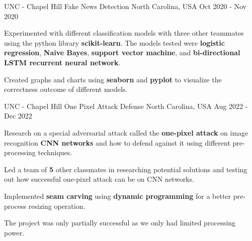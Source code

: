 

\begin{cventries}

  \cventry
    {UNC - Chapel Hill} %
    {Fake News Detection} %
    {North Carolina, USA} %
    {Oct 2020 - Nov 2020} %
    {
      \begin{cvitems} %
        \item {Experimented with different classification models with three other teammates using the python library \textbf{scikit-learn}. The models tested were \textbf{logistic regression}, \textbf{Naive Bayes}, \textbf{support vector machine}, and \textbf{bi-directional LSTM recurrent neural network}.}
        \item {Created graphs and charts using \textbf{seaborn} and \textbf{pyplot} to visualize the correctness outcome of different models.}
      \end{cvitems}
    }

  \cventry
    {UNC - Chapel Hill} %
    {One Pixel Attack Defense} %
    {North Carolina, USA} %
    {Aug 2022 - Dec 2022} %
    {
      \begin{cvitems} %
        \item {Research on a special adversarial attack called the \textbf{one-pixel attack} on image recognition \textbf{CNN networks} and how to defend against it using different pre-processing techniques.}
        \item {Led a team of \textbf{5} other classmates in researching potential solutions and testing out how successful one-pixel attack can be on CNN networks.}
        \item {Implemented \textbf{seam carving} using \textbf{dynamic programming} for a better pre-process resizing operation.}
        \item {The project was only partially successful as we only had limited processing power.}
      \end{cvitems}
    }

\end{cventries}
